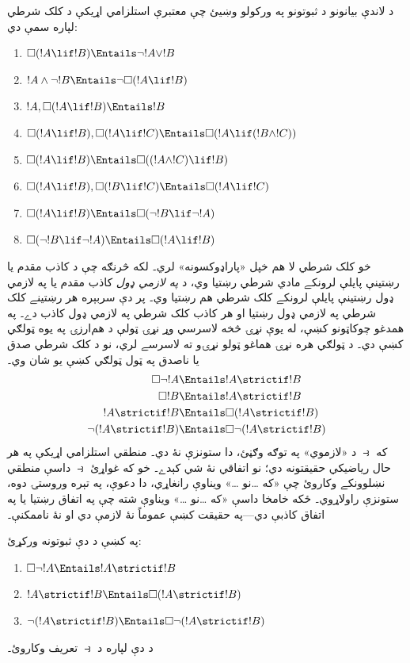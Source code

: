 \documentclass[../../../include/open-logic-section]{subfiles}
\begin{document}
\begin{prob}
  د لاندې بيانونو د  ثبوتونو په ورکولو وښيئ چې
  معتبرې استلزامي اړيکې د کلک شرطي لپاره سمې دي:
  \begin{enumerate}
  \item  $\Box(!A \lif !B) \Entails \lnot !A \lor !B$
  \item $!A \land \lnot !B \Entails \lnot\Box(!A \lif !B)$
  \item $!A, \Box(!A \lif !B) \Entails !B$
  \item $\Box(!A \lif !B), \Box(!A \lif !C) \Entails \Box(!A \lif (!B
    \land !C))$
  \item $\Box(!A \lif !B) \Entails \Box((!A \land !C) \lif !B)$
  \item $\Box(!A \lif !B), \Box(!B \lif !C) \Entails \Box(!A
    \lif !C)$
  \item $\Box(!A \lif !B) \Entails \Box(\lnot !B \lif \lnot !A)$
  \item $\Box(\lnot !B \lif \lnot !A) \Entails \Box(!A \lif !B)$
  \end{enumerate}
  \end{prob}

خو کلک شرطي لا هم خپل «پاراډوکسونه» لري۔ لکه څرنګه چې د
کاذب مقدم يا رښتينې پايلې لرونکے مادي شرطي رښتيا وي، د
\emph{په لازمي ډول} کاذب مقدم يا په لازمي ډول رښتينې پايلې
لرونکے کلک شرطي هم رښتيا وي۔ پر دې سربېره هر رښتينے کلک
شرطي په لازمي ډول رښتيا او هر کاذب کلک شرطي په لازمي ډول
کاذب دے۔ په همدغو چوکاټونو کښې، له يوې نړۍ څخه لاسرسي وړ
نړۍ ټولې د هم‌ارزۍ په يوه ټولګي کښې دي۔ د ټولګي هره نړۍ
هماغو ټولو نړۍو ته لاسرسے لري، نو د کلک شرطي صدق يا
ناصدق په ټول ټولګي کښې يو شان وي۔
\begin{align}
  \Box \lnot !A & \Entails !A \strictif !B\\
  \Box !B & \Entails !A \strictif !B\\
  !A \strictif !B& \Entails \Box(!A \strictif !B)\\
  \lnot(!A \strictif !B) & \Entails \Box\lnot(!A \strictif !B)
\end{align}
که $\strictif$ د «لازموي» په توګه وګڼئ، دا ستونزې نۀ دي۔
منطقي استلزامي اړيکې په هر حال رياضيکي حقيقتونه دي؛ نو
اتفاقي نۀ شي کېدے۔ خو که غواړئ $\strictif$ داسې منطقي
نښلوونکے وکاروئ چې «که \dots نو \dots» ويناوې رانغاړي، دا
دعوې، په تېره وروستۍ دوه، ستونزې راولاړوي۔ ځکه خامخا داسې
«که \dots نو \dots» ويناوې شته چې په اتفاق رښتيا يا په
اتفاق کاذبې دي---په حقيقت کښې عموماً نۀ لازمې دي او نۀ
ناممکنې۔

\begin{prob}
  په  کښې د دې ثبوتونه ورکړئ:
  \begin{enumerate}
    \item  $\Box \lnot !A \Entails !A \strictif !B$
    \item $!A \strictif !B \Entails \Box(!A \strictif !B)$
    \item $\lnot(!A \strictif !B)  \Entails \Box\lnot(!A \strictif !B)$
  \end{enumerate}
  د دې لپاره د $\strictif$ تعريف وکاروئ۔
\end{prob}
\end{document}
